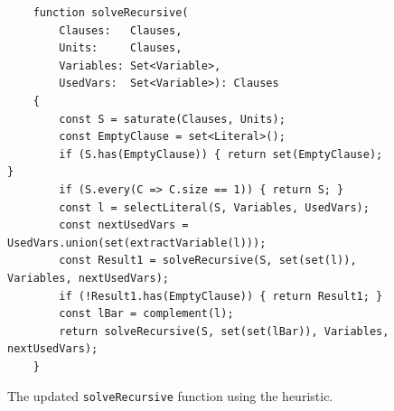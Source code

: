 \begin{figure}[!ht]
  \centering
\begin{verbatim}
    function solveRecursive(
        Clauses:   Clauses,
        Units:     Clauses,
        Variables: Set<Variable>,
        UsedVars:  Set<Variable>): Clauses
    {
        const S = saturate(Clauses, Units);
        const EmptyClause = set<Literal>();
        if (S.has(EmptyClause)) { return set(EmptyClause);  }
        if (S.every(C => C.size == 1)) { return S; }
        const l = selectLiteral(S, Variables, UsedVars);
        const nextUsedVars = UsedVars.union(set(extractVariable(l)));
        const Result1 = solveRecursive(S, set(set(l)), Variables, nextUsedVars);
        if (!Result1.has(EmptyClause)) { return Result1; }
        const lBar = complement(l);
        return solveRecursive(S, set(set(lBar)), Variables, nextUsedVars);
    }
\end{verbatim}
\vspace*{-0.3cm}
  \caption{The updated \texttt{solveRecursive} function using the heuristic.}
  \label{fig:solve_recursive_jw}
\end{figure}


